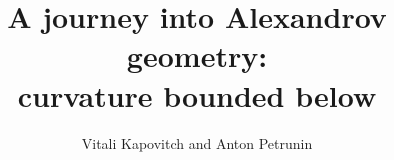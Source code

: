 \documentclass[twoside]{book}
\newcommand{\spell}[2]{#2} %
\def\thetitle{A journey into Alexandrov geometry:\\
curvature bounded below}
\def\theauthors{Vitali Kapovitch and Anton Petrunin}
\begin{document}
\spell{\pagestyle{empty}\renewcommand\includegraphics[2][{}]{}\def\emph{\textit}\renewcommand\footnote[1]{\ (#1)}\renewcommand\z{}\renewcommand\section[1]{SECTION. {#1} SECTION.}}{}

\frontmatter
\title{\thetitle}
\author{\theauthors}
\date{}
\maketitle
\thispagestyle{empty}

\mainmatter
\newpage
\tableofcontents





%











%

%
%



%

\backmatter



{


\def\emph{\textit}

\printbibliography[heading=bibintoc]
\fussy
}
\end{document}
